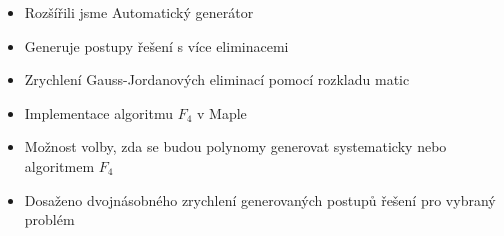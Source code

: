 \documentclass[cmpiitalkstyle, 25pt]{cmptalk}
\begin{document}
\begin{cmptalkslide}[Shrnutí]
  \begin{itemize}
    \item Rozšířili jsme Automatický generátor \cite{AutoGen}
    \item Generuje postupy řešení s více eliminacemi
    \item Zrychlení Gauss-Jordanových eliminací pomocí rozkladu matic
    \item Implementace algoritmu $F_4$ \cite{F4} v Maple
    \item Možnost volby, zda se budou polynomy generovat systematicky nebo algoritmem $F_4$ \cite{F4}
    \item Dosaženo dvojnásobného zrychlení generovaných postupů řešení pro vybraný problém \cite{9pt}
  \end{itemize}


\end{cmptalkslide}

\begin{cmptalkslide}
  
  {\small{}}
\end{cmptalkslide}

\end{document}
